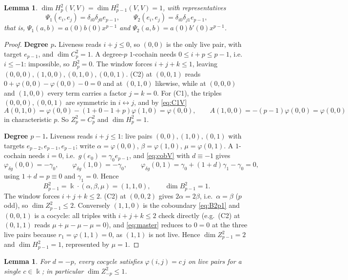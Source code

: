 \documentclass[11pt,reqno]{amsart}
\theoremstyle{plain}
\newtheorem{lemma}[theorem]{Lemma}
\theoremstyle{definition}
\newcommand{\kk}{\Bbbk}
\newcommand{\Zt}{Z^2}
\newcommand{\Bt}{B^2}
\newcommand{\Ht}{H^2}
\begin{document}
\begin{lemma}\label{lem:psi12}
$\dim\Ht_p(V,V)=\dim\Ht_{p-1}(V,V)=1$, with representatives
\[
\Psi_1(e_i,e_j)=\delta_{i0}\delta_{j0}e_{p-1},\qquad
\Psi_2(e_i,e_j)=\delta_{i0}\delta_{j1}e_{p-1},
\]
that is, $\Psi_1(a,b)=a(0)b(0)x^{p-1}$ and $\Psi_2(a,b)=a(0)b'(0)x^{p-1}$.
\end{lemma}

\begin{proof}
\textbf{Degree $p$.} Liveness reads $i+j\le0$, so $(0,0)$ is the only live pair, with target
$e_{p-1}$, and $\dim C^2_p=1$. A degree-$p$ $1$-cochain needs $0\le i+p\le p-1$, i.e.\
$i\le-1$: impossible, so $\Bt_p=0$. The window forces $i+j+k\le1$, leaving
$(0,0,0),(1,0,0),(0,1,0),(0,0,1)$. (C2) at $(0,0,1)$ reads
$0+\varphi(0,0)-\varphi(0,0)-0=0$ and at $(0,1,0)$ likewise, while at $(0,0,0)$ and
$(1,0,0)$ every term carries a factor $j=k=0$. For (C1), the triples $(0,0,0),(0,0,1)$ are
symmetric in $i\leftrightarrow j$, and by \eqref{eq:C1V}
\[
A(0,1,0)=\varphi(0,0)-(1+0-1+p)\varphi(1,0)=\varphi(0,0),\qquad
A(1,0,0)=-(p-1)\varphi(0,0)=\varphi(0,0)
\]
in characteristic $p$. So $\Zt_p=C^2_p$ and $\dim\Ht_p=1$.

\textbf{Degree $p-1$.} Liveness reads $i+j\le1$: live pairs $(0,0),(1,0),(0,1)$ with targets
$e_{p-2},e_{p-1},e_{p-1}$; write $\alpha=\varphi(0,0)$, $\beta=\varphi(1,0)$,
$\mu=\varphi(0,1)$. A $1$-cochain needs $i=0$, i.e.\ $g(e_0)=\gamma_0e_{p-1}$, and
\eqref{eq:cobV} with $d\equiv-1$ gives
\[
\varphi_{\delta g}(0,0)=-\gamma_0,\qquad \varphi_{\delta g}(1,0)=-\gamma_0,\qquad
\varphi_{\delta g}(0,1)=\gamma_0+(1+d)\gamma_1-\gamma_0=0,
\]
using $1+d=p\equiv0$ and $\gamma_1=0$. Hence
\begin{equation}
\Bt_{p-1}=\kk\cdot(\alpha,\beta,\mu)=(1,1,0),\qquad \dim\Bt_{p-1}=1 .
\label{eq:B2p1}
\end{equation}
The window forces $i+j+k\le2$. (C2) at $(0,0,2)$ gives $2\alpha=2\beta$, i.e.\
$\alpha=\beta$ ($p$ odd), so $\dim\Zt_{p-1}\le2$. Conversely $(1,1,0)$ is the coboundary
\eqref{eq:B2p1} and $(0,0,1)$ is a cocycle: all triples with $i+j+k\le2$ check directly
(e.g.\ (C2) at $(0,1,1)$ reads $\mu+\mu-\mu-\mu=0$), and \eqref{eq:master} reduces to $0=0$
at the three live pairs because $r_1=\varphi(1,1)=0$, as $(1,1)$ is not live. Hence
$\dim\Zt_{p-1}=2$ and $\dim\Ht_{p-1}=1$, represented by $\mu=1$.
\end{proof}

\begin{lemma}\label{lem:upper}
For $d=-p$, every cocycle satisfies $\varphi(i,j)=c\,j$ on live pairs for a single
$c\in\kk$; in particular $\dim\Zt_{-p}\le1$.
\end{lemma}
\end{document}
